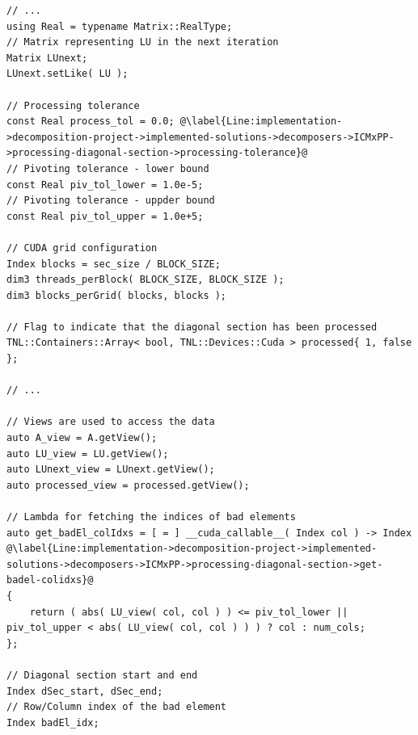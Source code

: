 \begin{lstlisting}[caption={An excerpt from the definition of the overloaded \code{decompose()} method for the ICM\_\textit{x}PP decomposer.
The excerpt highlights how the processing of a diagonal section is implemented.
For clarity, variables used in the code are declared and documented.
The \code{DSecCompute\_kernel()} and \code{DSecAssign\_kernel()} kernels compute and assign values of the diagonal section, respectively.
The kernels are presented separately in Listings~\ref{Listing:implementation->decomposition-project->implemented-solutions->decomposers->ICMxPP->kernels->diagonal-compute} and \ref{Listing:implementation->decomposition-project->implemented-solutions->decomposers->ICMxPP->kernels->diagonal-assign}.},label={Listing:implementation->decomposition-project->implemented-solutions->decomposers->ICMxPP->processing-diagonal-section},escapechar=@]
// ...
using Real = typename Matrix::RealType;
// Matrix representing LU in the next iteration
Matrix LUnext;
LUnext.setLike( LU );

// Processing tolerance
const Real process_tol = 0.0; @\label{Line:implementation->decomposition-project->implemented-solutions->decomposers->ICMxPP->processing-diagonal-section->processing-tolerance}@
// Pivoting tolerance - lower bound
const Real piv_tol_lower = 1.0e-5;
// Pivoting tolerance - uppder bound
const Real piv_tol_upper = 1.0e+5;

// CUDA grid configuration
Index blocks = sec_size / BLOCK_SIZE;
dim3 threads_perBlock( BLOCK_SIZE, BLOCK_SIZE );
dim3 blocks_perGrid( blocks, blocks );

// Flag to indicate that the diagonal section has been processed
TNL::Containers::Array< bool, TNL::Devices::Cuda > processed{ 1, false };

// ...

// Views are used to access the data
auto A_view = A.getView();
auto LU_view = LU.getView();
auto LUnext_view = LUnext.getView();
auto processed_view = processed.getView();

// Lambda for fetching the indices of bad elements
auto get_badEl_colIdxs = [ = ] __cuda_callable__( Index col ) -> Index @\label{Line:implementation->decomposition-project->implemented-solutions->decomposers->ICMxPP->processing-diagonal-section->get-badel-colidxs}@
{
	return ( abs( LU_view( col, col ) ) <= piv_tol_lower || piv_tol_upper < abs( LU_view( col, col ) ) ) ? col : num_cols;
};

// Diagonal section start and end
Index dSec_start, dSec_end;
// Row/Column index of the bad element
Index badEl_idx;


\end{lstlisting}
